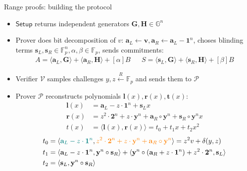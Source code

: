 \documentclass{zkdl-presentation-template}
\begin{document}
\begin{frame}{Range proofs: building the protocol}
    \begin{itemize}
        \item $\mathsf{Setup}$ returns independent generators $\mathbf{G}, \mathbf{H} \in \mathbb{G}^n$
        \item Prover does bit decomposition of $v$: $\mathbf{a}_L \gets \mathbf{v}, \mathbf{a}_R \gets \mathbf{a}_L - \mathbf{1}^n$, choses blinding terms $\mathbf{s}_L, \mathbf{s}_R \in \mathbb{F}_p^n, \alpha, \beta \in \mathbb{F}_p$, sends commitments:
            \begin{align*}
                A = \langle \mathbf{a}_L, \mathbf{G} \rangle + \langle \mathbf{a}_R, \mathbf{H} \rangle + [\alpha]B &&
                S = \langle \mathbf{s}_L, \mathbf{G} \rangle + \langle \mathbf{s}_R, \mathbf{H} \rangle + [\beta]B
            \end{align*}
        \item Verifier $\mathcal{V}$ samples challenges $y, z \xleftarrow{R} \mathbb{F}_p$ and sends them to $\mathcal{P}$
        \item Prover $\mathcal{P}$ reconstructs polynomials $\mathbf{l}(x), \mathbf{r}(x), \mathbf{t}(x)$:
            \begin{equation*}
                \begin{aligned}
                    \mathbf{l}(x) &= \mathbf{a}_L - z \cdot \mathbf{1}^n + \mathbf{s}_L x\\
                    \mathbf{r}(x) &= z^2 \cdot \mathbf{2}^n + z \cdot \mathbf{y}^n + \mathbf{a}_R \circ \mathbf{y}^n + \mathbf{s}_R \circ \mathbf{y}^n x\\
                    t(x) &= \langle \mathbf{l}(x), \mathbf{r}(x) \rangle = t_0 + t_1 x + t_2 x^2
                \end{aligned}
            \end{equation*}
            \begin{equation*}
                \begin{aligned}
                    t_0 &=  \langle \textcolor{teal}{\mathbf{a}_L - z \cdot \mathbf{1}^n}, \textcolor{orange}{z^2 \cdot \mathbf{2}^n + z \cdot \mathbf{y}^n + \mathbf{a}_R \circ \mathbf{y}^n}\rangle = z^2v + \delta(y,z)\\
                    t_1 &= \langle \mathbf{a}_L - z \cdot \mathbf{1}^n, \mathbf{y}^n \circ \mathbf{s}_R \rangle + \langle \mathbf{y}^n \circ (\mathbf{a}_R + z\cdot \mathbf{1}^n ) + z^2 \cdot \mathbf{2}^n, \mathbf{s}_L\rangle \\
                    t_2 & = \langle \mathbf{s}_L, \mathbf{y}^n \circ \mathbf{s}_R \rangle
                \end{aligned}
            \end{equation*}
    \end{itemize}
\end{frame}
\end{document}
